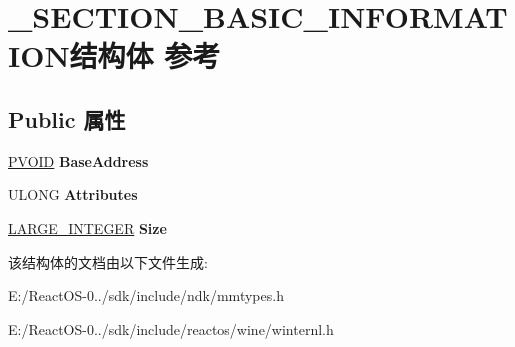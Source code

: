 \hypertarget{struct___s_e_c_t_i_o_n___b_a_s_i_c___i_n_f_o_r_m_a_t_i_o_n}{}\section{\+\_\+\+S\+E\+C\+T\+I\+O\+N\+\_\+\+B\+A\+S\+I\+C\+\_\+\+I\+N\+F\+O\+R\+M\+A\+T\+I\+O\+N结构体 参考}
\label{struct___s_e_c_t_i_o_n___b_a_s_i_c___i_n_f_o_r_m_a_t_i_o_n}
\subsection*{Public 属性}
\begin{DoxyCompactItemize}
\item 
\mbox{\label{struct___s_e_c_t_i_o_n___b_a_s_i_c___i_n_f_o_r_m_a_t_i_o_n_a22afafe5f2a533f1ab7c758e5a806d8c}} 
\hyperlink{interfacevoid}{P\+V\+O\+ID} {\bfseries Base\+Address}
\item 
\mbox{\label{struct___s_e_c_t_i_o_n___b_a_s_i_c___i_n_f_o_r_m_a_t_i_o_n_ab614a075fd1e8dae20c71fe7f4e30515}} 
U\+L\+O\+NG {\bfseries Attributes}
\item 
\mbox{\label{struct___s_e_c_t_i_o_n___b_a_s_i_c___i_n_f_o_r_m_a_t_i_o_n_ae9fc3e367e58d2a5503b1dc8e38efd56}} 
\hyperlink{union___l_a_r_g_e___i_n_t_e_g_e_r}{L\+A\+R\+G\+E\+\_\+\+I\+N\+T\+E\+G\+ER} {\bfseries Size}
\end{DoxyCompactItemize}


该结构体的文档由以下文件生成\+:\begin{DoxyCompactItemize}
\item 
E\+:/\+React\+O\+S-\/0../sdk/include/ndk/mmtypes.\+h\item 
E\+:/\+React\+O\+S-\/0../sdk/include/reactos/wine/winternl.\+h\end{DoxyCompactItemize}
